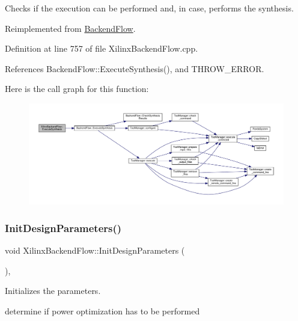 Checks if the execution can be performed and, in case, performs the synthesis. 



Reimplemented from \hyperlink{classBackendFlow_af0e8f1973185540298eaa3ac4bee3b2c}{Backend\+Flow}.



Definition at line 757 of file Xilinx\+Backend\+Flow.\+cpp.



References Backend\+Flow\+::\+Execute\+Synthesis(), and T\+H\+R\+O\+W\+\_\+\+E\+R\+R\+OR.

Here is the call graph for this function\+:
\nopagebreak
\begin{figure}[H]
\begin{center}
\leavevmode
\includegraphics[width=350pt]{d6/d94/classXilinxBackendFlow_a006b64153e4e8498948c37522fc24b0f_cgraph}
\end{center}
\end{figure}
\mbox{\label{classXilinxBackendFlow_a60d2b3155b8efbcba6ccf49d543751ea}} 
\subsubsection{\texorpdfstring{Init\+Design\+Parameters()}{InitDesignParameters()}}
{\footnotesize\ttfamily void Xilinx\+Backend\+Flow\+::\+Init\+Design\+Parameters (\begin{DoxyParamCaption}{ }\end{DoxyParamCaption})\hspace{0.3cm}{\ttfamily [override]}, {\ttfamily [virtual]}}



Initializes the parameters. 

determine if power optimization has to be performed

